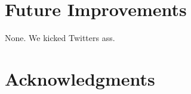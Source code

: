 \documentclass[11pt,letterpaper]{article}
\begin{document}
\section{Future Improvements}
None. We kicked Twitters ass.


\section*{Acknowledgments}





\end{document}

